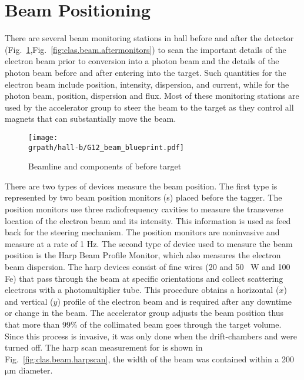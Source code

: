 \section{Beam Positioning}\label{sec:clas.beam}
There are several beam monitoring stations in hall  before and after the  detector (Fig.~\ref{fig:clas.beam.beforemonitors},Fig.~\ref{fig:clas.beam.aftermonitors}) to scan the important details of the electron beam prior to conversion into a photon beam and the details of the photon beam before and after entering into the target. Such quantities for the electron beam include position, intensity, dispersion, and current, while for the photon beam, position, dispersion and flux. Most of these monitoring stations  are used by the accelerator group to steer the beam to the target as they control all magnets that can substantially move the beam.
\begin{figure}[h!]\begin{center}
\texttt{[image: \\grpath/hall-b/G12\_beam\_blueprint.pdf]}
\caption[Beamline and components of  before target]{\label{fig:clas.beam.beforemonitors}{}Beamline and components of  before target}
\end{center}\end{figure}
There are two types of devices measure the beam position. The first type is represented by two beam position monitors (s\label{abbr:bpm}) placed before the tagger. The position monitors use three radiofrequency cavities to measure the transverse location of the electron beam and its intensity. This information is used as feed back for the steering mechanism. The position monitors are noninvasive and measure at a rate of 1 Hz. 
The second type of device used to measure the beam position is the Harp Beam Profile Monitor, which also measures the electron beam dispersion. The harp devices consist of fine wires (20 and 50~{\um} W and 100~{\um} Fe) that pass through the beam at specific orientations and collect scattering electrons with a photomultiplier tube. This procedure obtains a horizontal ($x$) and vertical ($y$) profile of the electron beam and is required after any downtime or change in the beam. The accelerator group adjusts the beam position thus that more than 99\% of the collimated beam goes through the target volume. Since this process is invasive, it was only done when the drift-chambers and  were turned off. The harp scan measurement for  is shown in Fig.~\ref{fig:clas.beam.harpscan}, the width of the beam was contained within a 200 $\mathrm{\mu}$m diameter.



